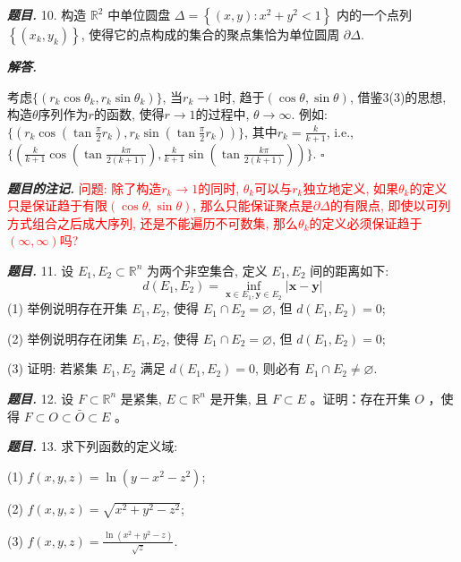 \documentclass[10pt, a4paper, oneside]{ctexart}
\newenvironment{problem}{\begin{framed}\par\noindent\textbf{\textit{题目. }}}{\end{framed}\par}
\newenvironment{solution}{%
  \par\noindent\textbf{\textit{解答. }}\ignorespaces
}{%
  \hfill\ensuremath{\square}\par %
}
\newenvironment{note}{\par\noindent\textbf{\textit{题目的注记. }}\ignorespaces}{\par}
\begin{document}
\begin{problem}
10. 构造 $\mathbb{R}^2$ 中单位圆盘 $\Delta=\left\{(x, y): x^2+y^2<1\right\}$ 内的一个点列 $\left\{\left(x_k, y_k\right)\right\}$, 使得它的点构成的集合的聚点集恰为单位圆周 $\partial \Delta$.
\end{problem}

\begin{solution}
考虑$\{(r_k\cos \theta_k, r_k \sin \theta_k)\}$, 当$r_k\to 1$时, 趋于$(\cos\theta, \sin\theta)$, 借鉴3(3)的思想, 构造$\theta$序列作为$r$的函数, 使得$r\to 1$的过程中, $\theta\to \infty$. 例如: $\{(r_k\cos(\tan \frac{\pi}{2}r_k),r_k\sin(\tan \frac{\pi}{2}r_k))\}$, 其中$r_k=\frac{k}{k+1}$, i.e., $\{(\frac{k}{k+1}\cos(\tan \frac{k\pi}{2(k+1)}),\frac{k}{k+1}\sin(\tan \frac{k\pi}{2(k+1)}))\}$.
\end{solution}
\begin{note}
    \textcolor{red}{问题: 除了构造$r_k\to 1$的同时, $\theta_k$可以与$r_k$独立地定义, 如果$\theta_k$的定义只是保证趋于有限$(\cos \theta, \sin \theta)$, 那么只能保证聚点是$\partial \Delta$的有限点, 即使以可列方式组合之后成大序列, 还是不能遍历不可数集, 那么$\theta_k$的定义必须保证趋于$(\infty, \infty)$吗?}
\end{note}

\begin{problem}
11. 设 $E_1, E_2 \subset \mathbb{R}^n$ 为两个非空集合, 定义 $E_1, E_2$ 间的距离如下:
$$
d\left(E_1, E_2\right)=\inf _{\boldsymbol{x} \in E_1, \boldsymbol{y} \in E_2}|\boldsymbol{x}-\boldsymbol{y}|
$$
(1) 举例说明存在开集 $E_1, E_2$, 使得 $E_1 \cap E_2=\varnothing$, 但 $d\left(E_1, E_2\right)=0$;

(2) 举例说明存在闭集 $E_1, E_2$, 使得 $E_1 \cap E_2=\varnothing$, 但 $d\left(E_1, E_2\right)=0$;

(3) 证明: 若紧集 $E_1, E_2$ 满足 $d\left(E_1, E_2\right)=0$, 则必有 $E_1 \cap E_2 \neq \varnothing$.
\end{problem}

\begin{problem}
12. 设 $F \subset \mathbb{R}^n$ 是紧集, $E \subset \mathbb{R}^n$ 是开集, 且 $F \subset E$ 。证明：存在开集 $O$ ，使得 $F \subset O \subset \bar{O} \subset E$ 。
\end{problem}

\begin{problem}
13. 求下列函数的定义域:

(1) $f(x, y, z)=\ln \left(y-x^2-z^2\right)$;

(2) $f(x, y, z)=\sqrt{x^2+y^2-z^2}$;

(3) $f(x, y, z)=\frac{\ln \left(x^2+y^2-z\right)}{\sqrt{z}}$.
\end{problem}
\end{document}
